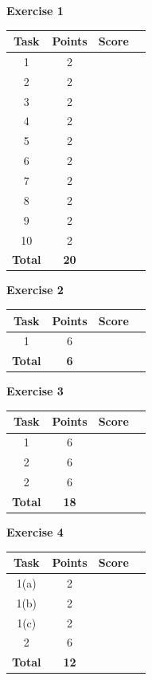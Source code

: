 \documentclass [11pt, a4wide, twoside]{article}
\begin{document}
\begin{minipage}[t]{120pt}
\textbf{Exercise 1}
\vspace{5pt}\\
\begin{tabular}{|c|c|c|c|}
\hline
Task & Points & Score \\\hline
1  & 2 & \\\hline
2  & 2 & \\\hline
3  & 2 & \\\hline
4  & 2 & \\\hline
5  & 2 & \\\hline
6  & 2 & \\\hline
7  & 2 & \\\hline
8  & 2 & \\\hline
9  & 2 & \\\hline
10 & 2 & \\\hline
\textbf{Total} & \textbf{20} &\\\hline\hline
\end{tabular}
\end{minipage}
\begin{minipage}[t]{120pt}


\textbf{Exercise 2}
\vspace{5pt}\\
\begin{tabular}{|c|c|c|c|}
\hline
Task & Points & Score \\\hline
1 & 6 & \\\hline
\textbf{Total} & \textbf{6} &\\\hline\hline
\end{tabular}
\end{minipage}
\begin{minipage}[t]{120pt}


\textbf{Exercise 3}
\vspace{5pt}\\
\begin{tabular}{|c|c|c|c|}
\hline
Task & Points & Score \\\hline
1 & 6 & \\\hline
2 & 6 & \\\hline
2 & 6 & \\\hline
\textbf{Total} & \textbf{18} &\\\hline\hline
\end{tabular}
\end{minipage}
\begin{minipage}[t]{120pt}


\textbf{Exercise 4}
\vspace{5pt}\\
\begin{tabular}{|c|c|c|c|}
\hline
Task & Points & Score \\\hline
1(a) & 2 & \\\hline
1(b) & 2 & \\\hline
1(c) & 2 & \\\hline
2 & 6 & \\\hline
\textbf{Total} & \textbf{12} &\\\hline\hline
\end{tabular}
\end{minipage}
\end{document}
